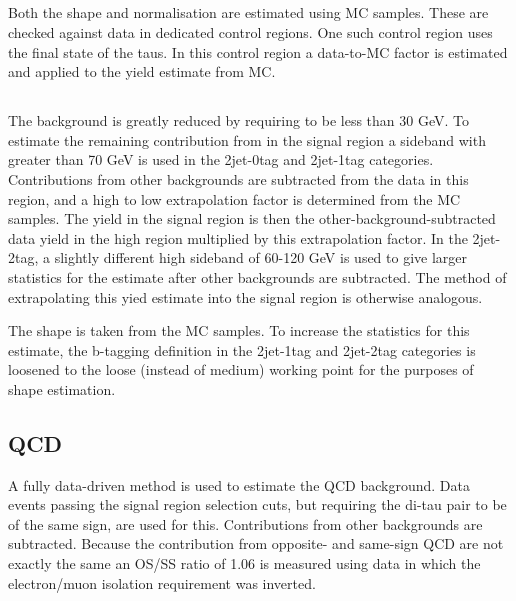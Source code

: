 \subsection{\texorpdfstring{\ttbar}{ttbar}}
Both the \ttbar shape and normalisation are estimated using \ac{MC} samples.
These are checked against data in dedicated control regions. One such control
region uses the \emu final state of the taus. In this control region
a data-to-\ac{MC} factor is estimated and applied to the yield estimate from \ac{MC}.

\subsection{\texorpdfstring{\Wjets}{W + jets}}
\label{sec:hhh_backgrounds_wjets}
The \Wjets background is greatly reduced by requiring \mT to
be less than 30 GeV. To estimate the remaining contribution
from \Wjets in the signal region a sideband with \mT greater
than 70 GeV is used in the 2jet-0tag and 2jet-1tag categories.
Contributions from other backgrounds are subtracted 
from the data in this region, and a high \mT to low \mT
extrapolation factor is determined from the \Wjets \ac{MC} 
samples. The yield in the signal region is then the other-background-subtracted
data yield in the high \mT region multiplied by this extrapolation factor.
In the 2jet-2tag, a slightly different high \mT sideband of 60-120 GeV is used 
to give larger statistics for the \Wjets estimate after other backgrounds are
subtracted. The method of extrapolating this yied estimate into
the signal region is otherwise analogous.

The \Wjets shape is taken from the \ac{MC} samples. To 
increase the statistics for this estimate, the b-tagging definition
in the 2jet-1tag and 2jet-2tag categories is loosened to the loose (instead of medium)
working point for the purposes of shape estimation.


\subsection{QCD}
\label{sec:hhh_backgrounds_qcd}
A fully data-driven method is used to estimate the QCD background. Data events
passing the signal region selection cuts, but requiring the di-tau pair to be
of the same sign, are used for this. Contributions from other backgrounds are 
subtracted. Because the contribution from opposite- and same-sign QCD are
not exactly the same an OS/SS ratio of 1.06 is measured using data in which
the electron/muon isolation requirement was inverted. 

